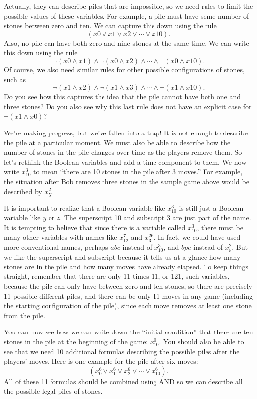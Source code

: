 {{Actually, they can describe piles that are impossible, so we need rules to limit the possible values of these variables. 
For example, a pile must have some number of stones between zero and ten. We can capture this down using the rule
$$(x0 \vee x1 \vee x2 \vee \cdots \vee x10).$$
Also, no pile can have both zero and nine stones at the same time. We can write this down using the rule
$$\neg(x0 \wedge x1) \wedge \neg(x0 \wedge x2) \wedge \cdots \wedge \neg(x0 \wedge x10).$$
Of course, we also need similar rules for other possible configurations of stones, such as
$$\neg(x1 \wedge x2) \wedge \neg(x1 \wedge x3) \wedge \cdots \wedge \neg(x1 \wedge x10).$$
Do you see how this captures the idea that the pile cannot have both one and three stones? Do you also see
why this last rule does not have an explicit case for $\neg(x1 \wedge x0)$?

We're making progress, but we've fallen into a trap! It is not enough to describe the pile at a particular moment. 
We must also be able to describe how the number of stones in the pile changes over time as the players remove them.
So let's rethink the Boolean variables and add a time component to them. We now write $x_{10}^{3}$ to mean 
``there are 10 stones in the pile after 3 moves.'' For example, the situation after Bob removes three stones in the
sample game above would be described by $x_{5}^{2}$. 

It is important to realize that a Boolean variable like $x_{10}^{3}$
is still just a Boolean variable like $y$ or $z$. The superscript 10 and subscript 3 are just part of the name. It
is tempting to believe that since there is a variable called $x_{10}^{3}$, there must be many other variables with
names like $x_{12}^{7}$ and $x_{3}^{26}$. In fact, we could have used more conventional names, perhaps $abc$ instead
of $x_{10}^{3}$, and $bpe$ instead of $x_{5}^{2}$. But we like the superscript and subscript because it tells us at 
a glance how many stones are in the pile and how many moves have already elapsed. To keep things straight, remember 
that there are only 11 times 11, or 121, such variables, because the pile can only have between zero and ten stones, so there are
precisely 11 possible different piles, and there can be only 11 moves in any game (including the starting configuration 
of the pile), since each move removes at least one stone from the pile.

You can now see how we can write down the ``initial condition'' that there are ten stones in the pile at the beginning
of the game: $x_{10}^{0}$.
You should also be able to see that we need 10 additional formulas describing the possible piles 
after the players' moves. Here is one example for the pile after six moves:
$$(x_{0}^{6} \vee x_{1}^{6} \vee x_{2}^{6} \vee \cdots \vee x_{10}^{6}).$$
All of these 11 formulas should be combined using AND so we can describe all the possible legal piles of stones.

}}
